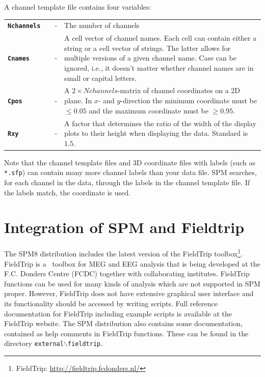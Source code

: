 A channel template file contains four variables:\\

\begin{tabular}{llcp{9cm}}

{\bf \texttt{Nchannels}} & &  - & The number of channels\\

{\bf \texttt{Cnames}}&  & - & A cell vector of channel names. Each cell can contain either a string or a cell vector of strings. The latter allows
for multiple versions of a given channel name. Case can be ignored, i.e., it doesn't matter whether channel names are in small or capital letters.\\

{\bf \texttt{Cpos}} & & - & A $2 \times Nchannels$-matrix of channel coordinates on a 2D plane. In $x$- and $y$-direction the minimum coordinate must be $\leq 0.05$ and the maximum coordinate must be $\geq 0.95$. \\

{\bf \texttt{Rxy}} & & - & A factor that determines the ratio of the width of the display plots to their height when displaying the data. Standard is $1.5$. \\

\end{tabular}

Note that the channel template files and 3D coordinate files with labels (such as \texttt{*.sfp}) can contain many more channel labels than your data file. SPM searches, for each channel in the data, through the labels in the channel template file. If the labels match, the coordinate is used.

\section{Integration of SPM and Fieldtrip}
The SPM8 distribution includes the latest version of the FieldTrip toolbox\footnote{FieldTrip: \url{http://fieldtrip.fcdonders.nl/}}. FieldTrip is a \matlab\ toolbox for MEG and EEG analysis that is being developed at the F.C. Donders Centre (FCDC) together with collaborating institutes. FieldTrip functions can be used for many kinds of analysis which are not supported in SPM proper. However, FieldTrip does not have extensive graphical user interface and its functionality should be accessed by writing scripts. Full reference documentation for FieldTrip including example scripts is available at the FieldTrip website. The SPM distribution also contains some documentation, contained as help comments in FieldTrip functions. These can be found in the directory \texttt{external$\backslash$fieldtrip}. 


